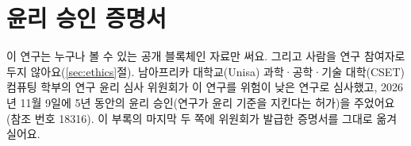 \section{윤리 승인 증명서}
\label{ch:appendix-ethics}

이 연구는 누구나 볼 수 있는 공개 블록체인 자료만 써요. 그리고 사람을 연구 참여자로 두지 않아요(\ref{sec:ethics}절). 남아프리카 대학교(Unisa) 과학·공학·기술 대학(CSET) 컴퓨팅 학부의 연구 윤리 심사 위원회가 이 연구를 위험이 낮은 연구로 심사했고, 2026년 11월 9일에 5년 동안의 윤리 승인(연구가 윤리 기준을 지킨다는 허가)을 주었어요(참조 번호 18316). 이 부록의 마지막 두 쪽에 위원회가 발급한 증명서를 그대로 옮겨 실어요.

\clearpage

